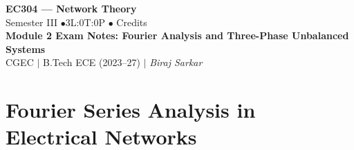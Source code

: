 \documentclass[12pt,a4paper]{article}
\begin{document}
\begin{center}
  {\LARGE\bfseries\color{myred} EC304 --- Network Theory}\\[5pt]
  {\normalsize\color{mydark} Semester III \quad$\bullet$\quad 3L:0T:0P \quad$\bullet$ Credits}\\[3pt]
  {\normalsize\color{myteal}\textbf{Module 2 Exam Notes: Fourier Analysis and Three-Phase Unbalanced Systems}}\\[3pt]
  {\small\color{mydark} CGEC \;$|$\; B.Tech ECE (2023--27) \;$|$\; \textit{Biraj Sarkar}}
\end{center}
\vspace{2pt}
\noindent{\color{myred}\rule{\linewidth}{1.5pt}}
\vspace{2pt}

\hypersetup{linkcolor=mydark}
\tableofcontents
\hypersetup{linkcolor=myteal}
\newpage

\section{Fourier Series Analysis in Electrical Networks}
\end{document}
